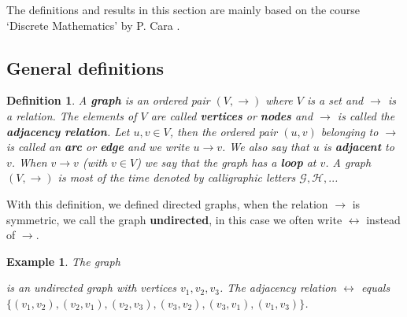 \documentclass[a4paper,11pt]{report}
\newtheorem{example}[theorem]{Example}
\newtheorem{definition}[theorem]{Definition}
\begin{document}
The definitions and results in this section are mainly based on the course 
`Discrete Mathematics' by P. Cara \cite{cara}. 


\subsection{General definitions}
\begin{definition}\label{defgraf}
  A \textbf{graph} is an ordered pair $(V,\rightarrow)$ where $V$ is a set and $\to$ is a relation. The elements of $V$ are called
 \textbf{vertices} or \textbf{nodes} and $\rightarrow$ is called the \textbf{adjacency relation}. Let $u, v \in V$, then the ordered pair 
 $(u, v)$ belonging to $\to$ is called an \textbf{arc} or \textbf{edge} and we write $u \rightarrow v$. We also
 say that $u$ is \textbf{adjacent} to $v$.  When $v \to v$ (with $v \in V$) we say that the graph has a 
 \textbf{loop} at $v$. A graph $(V,\rightarrow)$ is 
  most of the time denoted by calligraphic letters $\mathscr{G}, 
  \mathscr{H},..$.   \end{definition}
With this definition, we defined directed graphs, when the relation $\rightarrow$ is symmetric, 
 we call the graph \textbf{undirected}, in this case we often write $\leftrightarrow$ instead 
 of $\rightarrow$.  
 
 
 \begin{example}\label{simpelegraf}
  The graph
  \begin{center}

\end{center}
is an undirected graph with vertices $v_1, v_2, v_3$. The adjacency 
relation $\leftrightarrow$ equals \\$\{(v_1,v_2), (v_2,v_1), (v_2, v_3), (v_3,v_2), (v_3, v_1), 
(v_1,v_3)\}$.
\end{example}
\end{document}

